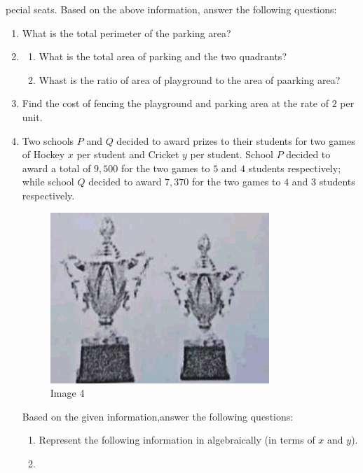 \begin{enumerate}
pecial seats.
Based on the above information, answer the following questions:
\begin{enumerate}
\item
What is the total perimeter of the parking area?
\item
\begin{enumerate}
\item
What is the total area of parking and the two quadrants?
\item
Whast is the ratio of area of playground to the area of paarking area?
\end{enumerate}
\item
Find the cost of fencing the playground and parking area at the rate of \rupee $2$ per unit.
\newpage
\item
Two schools $P$ and $Q$ decided to award prizes to their students for two games of Hockey \rupee $x$ per student and Cricket \rupee $y$ per student. School $P$ decided to award a total of \rupee $9,500$ for the two games to $5$ and $4$ students respectively; while school $Q$ decided to award
 \rupee $7,370$ for the two games to $4$ and $3$ students respectively.
\begin{figure}[h!]
\centering
\includegraphics[width=\columnwidth]{figs/img4.jpg}
\caption{Image 4}
\end{figure}
Based on the given information,answer the following questions:
\begin{enumerate}
\item
Represent the following information in algebraically (in terms of $x$ and $y$).
\item

\end{enumerate}
\end{enumerate}
\end{enumerate}
